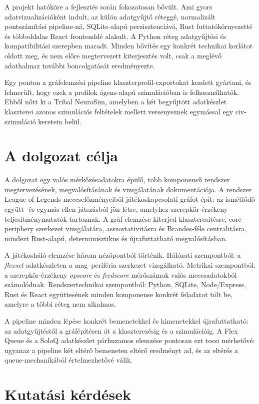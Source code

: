 A projekt hatóköre a fejlesztés során fokozatosan bővült. Ami gyors adatvizualizációként indult, az külön adatgyűjtő réteggé, normalizált pontszámítási pipeline-ná, SQLite-alapú perzisztenciává, Rust futtatókörnyezetté és többoldalas React frontenddé alakult. A Python réteg adatgyűjtési és kompatibilitási szerepben maradt. Minden bővítés egy konkrét technikai korlátot oldott meg, és nem előre megtervezett kiterjesztés volt, csak a meglévő adathalmaz további boncolgatását eredményezte.

Egy ponton a gráfelemzési pipeline klaszterprofil-exportokat kezdett gyártani, és felmerült, hogy ezek a profilok ágens-alapú szimulációban is felhasználhatók. Ebből nőtt ki a Tribal NeuroSim, amelyben a két begyűjtött adatkészlet klaszterei azonos szimulációs feltételek mellett versenyeznek egymással egy civ-szimuláció keretein belül.

\section{A dolgozat célja}

A dolgozat egy valós mérkőzésadatokra épülő, több komponensű rendszer megtervezésének, megvalósításának és vizsgálatának dokumentációja. A rendszer League of Legends meccselőzményeiből játékoskapcsolati gráfot épít: az ismétlődő együtt- és egymás ellen játszásból jön létre, amelyhez szerepkör-érzékeny teljesítménymutatók tartoznak. A gráf elemzése kiterjed klaszteresítésre, core-periphery szerkezet vizsgálatára, asszortativitásra és Brandes-féle centralitásra, mindezt Rust-alapú, determinisztikus és újrafuttatható megvalósításban.

A játékosháló elemzése három nézőpontból történik. Hálózati szempontból: a \textit{flexset} adatkészleten a mag–periféria szerkezet vizsgálható. Metrikai szempontból: a szerepkör-érzékeny \textit{opscore} és \textit{feedscore} mérőszámok valós meccsadatokból számolódnak. Rendszertechnikai szempontból: Python, SQLite, Node/Express, Rust és React együttesének minden komponense konkrét feladatot tölt be, amelyre a többi réteg nem alkalmas.

A pipeline minden lépése konkrét bemenetekkel és kimenetekkel újrafuttatható: az adatgyűjtéstől a gráfépítésen át a klaszterezésig és a szimulációig. A Flex Queue és a SoloQ adatkészlet párhuzamos elemzése pontosan ezt teszi mérhetővé: ugyanaz a pipeline két eltérő bemeneten eltérő eredményt ad, és az eltérés a queue-mechanikából értelmezhetővé válik.

\section{Kutatási kérdések}

